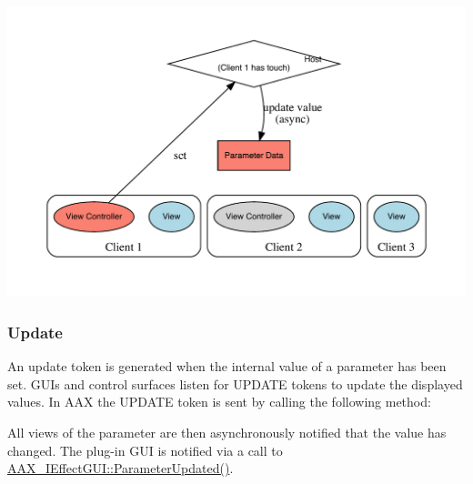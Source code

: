 \begin{DoxyImage}
\includegraphics[width=\textwidth,height=\textheight/2,keepaspectratio=true]{dot_aax_parameter_entities_update}
\end{DoxyImage}
 \hypertarget{a00822_tokenProtocol_introductionToTokens_update}{}\subsubsection{Update}\label{a00822_tokenProtocol_introductionToTokens_update}
An update token is generated when the internal value of a parameter has been set. G\+U\+Is and control surfaces listen for U\+P\+D\+A\+TE tokens to update the displayed values. In A\+AX the U\+P\+D\+A\+TE token is sent by calling the following method\+:


\begin{DoxyCode}{0}
\DoxyCodeLine{\{}
\DoxyCodeLine{\};}
\end{DoxyCode}


All views of the parameter are then asynchronously notified that the value has changed. The plug-\/in G\+UI is notified via a call to \mbox{\hyperlink{a01665_a45b468fef806611581f748af9301ab4d}{A\+A\+X\+\_\+\+I\+Effect\+G\+U\+I\+::\+Parameter\+Updated()}}.


